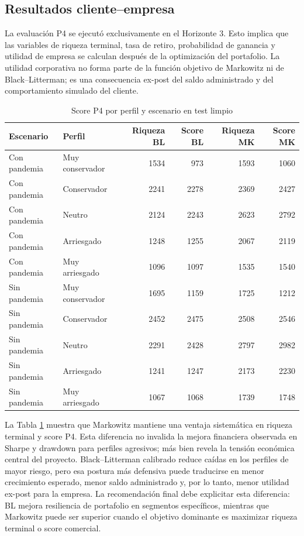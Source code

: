 \documentclass[11pt]{article}
\begin{document}
\subsection{Resultados cliente--empresa}

La evaluaci\'on P4 se ejecut\'o exclusivamente en el Horizonte 3. Esto implica que las variables de riqueza terminal, tasa de retiro, probabilidad de ganancia y utilidad de empresa se calculan despu\'es de la optimizaci\'on del portafolio. La utilidad corporativa no forma parte de la funci\'on objetivo de Markowitz ni de Black--Litterman; es una consecuencia ex-post del saldo administrado y del comportamiento simulado del cliente.

\begin{table}[H]
\centering
\caption{Score P4 por perfil y escenario en test limpio}
\label{tab:p4}
\begin{tabular}{l l r r r r}
\toprule
Escenario & Perfil & Riqueza BL & Score BL & Riqueza MK & Score MK \\
\midrule
Con pandemia & Muy conservador & 1534 & 973 & 1593 & 1060 \\
Con pandemia & Conservador & 2241 & 2278 & 2369 & 2427 \\
Con pandemia & Neutro & 2124 & 2243 & 2623 & 2792 \\
Con pandemia & Arriesgado & 1248 & 1255 & 2067 & 2119 \\
Con pandemia & Muy arriesgado & 1096 & 1097 & 1535 & 1540 \\
\midrule
Sin pandemia & Muy conservador & 1695 & 1159 & 1725 & 1212 \\
Sin pandemia & Conservador & 2452 & 2475 & 2508 & 2546 \\
Sin pandemia & Neutro & 2291 & 2428 & 2797 & 2982 \\
Sin pandemia & Arriesgado & 1241 & 1247 & 2173 & 2230 \\
Sin pandemia & Muy arriesgado & 1067 & 1068 & 1739 & 1748 \\
\bottomrule
\end{tabular}
\end{table}

La Tabla \ref{tab:p4} muestra que Markowitz mantiene una ventaja sistem\'atica en riqueza terminal y score P4. Esta diferencia no invalida la mejora financiera observada en Sharpe y drawdown para perfiles agresivos; m\'as bien revela la tensi\'on econ\'omica central del proyecto. Black--Litterman calibrado reduce ca\'idas en los perfiles de mayor riesgo, pero esa postura m\'as defensiva puede traducirse en menor crecimiento esperado, menor saldo administrado y, por lo tanto, menor utilidad ex-post para la empresa. La recomendaci\'on final debe explicitar esta diferencia: BL mejora resiliencia de portafolio en segmentos espec\'ificos, mientras que Markowitz puede ser superior cuando el objetivo dominante es maximizar riqueza terminal o score comercial.
\end{document}
